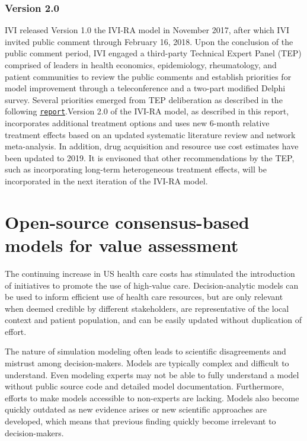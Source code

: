 \documentclass[11pt,final,fleqn]{article}
\theoremstyle{plain}
\newcommand{\code}[1]{\texttt{#1}}
\begin{document}
\subsubsection*{Version 2.0}
IVI released Version 1.0 the IVI-RA model in November 2017, after which IVI invited public comment through February 16, 2018. Upon the conclusion of the public comment period, IVI engaged a third-party Technical Expert Panel (TEP) comprised of leaders in health economics, epidemiology, rheumatology, and patient communities to review the public comments and establish priorities for model improvement through a teleconference and a two-part modified Delphi survey. Several priorities emerged from TEP deliberation as described in the following \code{\href{https://www.thevalueinitiative.org/wp-content/uploads/2018/09/OSVP-IVI-RA-Model-v1.0-Process-Summary_FINAL.pdf}{report}}.Version 2.0 of the IVI-RA model, as described in this report, incorporates additional treatment options and uses new 6-month relative treatment effects based on an updated systematic literature review and network meta-analysis. In addition, drug acquisition and resource use cost estimates have been updated to 2019. It is envisoned that other recommendations by the TEP, such as incorporating long-term heterogeneous treatment effects, will be incorporated in the next iteration of the IVI-RA model.




\clearpage
\section{Open-source consensus-based models for value assessment}\label{sec:osvp}
The continuing increase in US health care costs has stimulated the introduction of initiatives to promote the use of high-value care. Decision-analytic models can be used to inform efficient use of health care resources, but are only relevant when deemed credible by different stakeholders, are representative of the local context and patient population, and can be easily updated without duplication of effort.

The nature of simulation modeling often leads to scientific disagreements and mistrust among decision-makers. Models are typically complex and difficult to understand. Even modeling experts may not be able to fully understand a model without public source code and detailed model documentation. Furthermore, efforts to make models accessible to non-experts are lacking. Models also become quickly outdated as new evidence arises or new scientific approaches are developed, which means that previous finding quickly become irrelevant to decision-makers.
\end{document}
